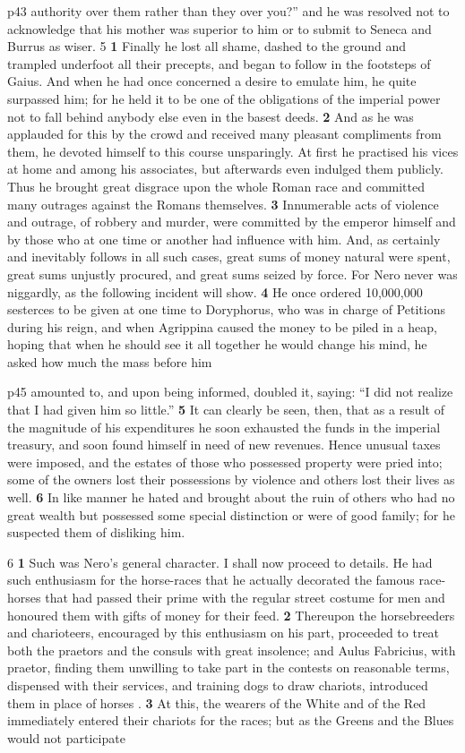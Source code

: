 p43 authority over them rather than they over you?'' and he was resolved not to acknowledge that his mother was superior to him or to submit to Seneca and Burrus as wiser. 5 \textbf{1} Finally he lost all shame, dashed to the ground and trampled underfoot all their precepts, and began to follow in the footsteps of Gaius. And when he had once concerned a desire to emulate him, he quite surpassed him; for he held it to be one of the obligations of the imperial power not to fall behind anybody else even in the basest deeds. \textbf{2} And as he was applauded for this by the crowd and received many pleasant compliments from them, he devoted himself to this course unsparingly. At first he practised his vices at home and among his associates, but afterwards even indulged them publicly. Thus he brought great disgrace upon the whole Roman race and committed many outrages against the Romans themselves. \textbf{3} Innumerable acts of violence and outrage, of robbery and murder, were committed by the emperor himself and by those who at one time or another had influence with him. And, as certainly and inevitably follows in all such cases, great sums of money natural were spent, great sums unjustly procured, and great sums seized by force. For Nero never was niggardly, as the following incident will show. \textbf{4} He once ordered 10,000,000 sesterces to be given at one time to Doryphorus, who was in charge of Petitions during his reign, and when Agrippina caused the money to be piled in a heap, hoping that when he should see it all together he would change his mind, he asked how much the mass before him

p45 amounted to, and upon being informed, doubled it, saying: ``I did not realize that I had given him so little.'' \textbf{5} It can clearly be seen, then, that as a result of the magnitude of his expenditures he soon exhausted the funds in the imperial treasury, and soon found himself in need of new revenues. Hence unusual taxes were imposed, and the estates of those who possessed property were pried into; some of the owners lost their possessions by violence and others lost their lives as well. \textbf{6} In like manner he hated and brought about the ruin of others who had no great wealth but possessed some special distinction or were of good family; for he suspected them of disliking him.

6 \textbf{1} Such was Nero's general character. I shall now proceed to details. He had such enthusiasm for the horse-races that he actually decorated the famous race-horses that had passed their prime with the regular street costume for men and honoured them with gifts of money for their feed. \textbf{2} Thereupon the horsebreeders and charioteers, encouraged by this enthusiasm on his part, proceeded to treat both the praetors and the consuls with great insolence; and Aulus Fabricius, with praetor, finding them unwilling to take part in the contests on reasonable terms, dispensed with their services, and training dogs to draw chariots, introduced them in place of horses . \textbf{3} At this, the wearers of the White and of the Red immediately entered their chariots for the races; but as the Greens and the Blues would not participate

